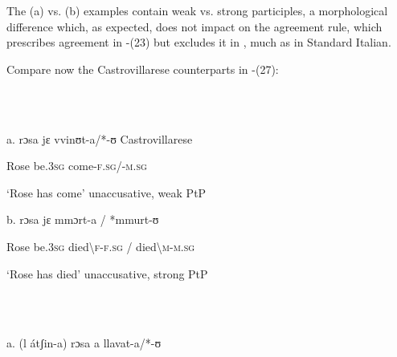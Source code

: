 \documentclass[output=paper]{langscibook}
\begin{document}
The (a) vs. (b) examples contain weak vs. strong participles, a morphological difference which, as expected, does not impact on the agreement rule, which prescribes agreement in -(23) but excludes it in , much as in Standard Italian.

Compare now the Castrovillarese counterparts in -(27): 

\begin{styleTabellaLUNGA}
\ea%
    \label{ex:key:25}
    \gll \\
         \\
    \glt
    \z %

          a.  rɔsa   jɛ     vvinʊt{}-a/*-ʊ                 Castrovillarese
\end{styleTabellaLUNGA}

\begin{styleTabellaLUNGA}
    Rose   be.3\textsc{sg}   come-\textsc{f.sg}/-\textsc{m.sg}            
\end{styleTabellaLUNGA}

\begin{styleTabellaLUNGA}
    ‘Rose has come’                     unaccusative, weak PtP
\end{styleTabellaLUNGA}

\begin{styleTabellaLUNGA}
  b.  rɔsa   jɛ     mmɔrt-a    /  *mmurt-ʊ         
\end{styleTabellaLUNGA}

\begin{styleTabellaLUNGA}
    Rose   be.3\textsc{sg}   died{\textbackslash}\textsc{f}{}-\textsc{f.sg}   /   died{\textbackslash}\textsc{m}{}-\textsc{m.sg}
\end{styleTabellaLUNGA}

\begin{styleTabellaLUNGA}
    ‘Rose has died’                     unaccusative, strong PtP
\end{styleTabellaLUNGA}

\begin{styleTabellaLUNGA}
\ea%
    \label{ex:key:26}
    \gll \\
         \\
    \glt
    \z %

          a.  (l átʃin-a)         rɔsa     a           llavat-a/*-ʊ 
\end{styleTabellaLUNGA}
\end{document}
